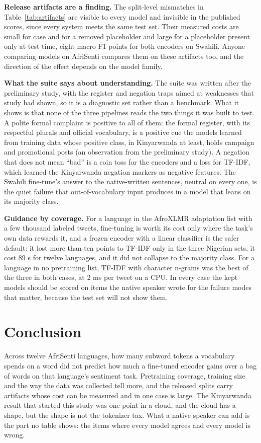 \documentclass[11pt]{article}
\begin{document}
\textbf{Release artifacts are a finding.} The split-level mismatches in Table~\ref{tab:artifacts} are visible to every model and invisible in the published scores, since every system meets the same test set. Their measured costs are small for case and for a removed placeholder and large for a placeholder present only at test time, eight macro F1 points for both encoders on Swahili. Anyone comparing models on AfriSenti compares them on these artifacts too, and the direction of the effect depends on the model family.

\textbf{What the suite says about understanding.} The suite was written after the preliminary study, with the register and negation traps aimed at weaknesses that study had shown, so it is a diagnostic set rather than a benchmark. What it shows is that none of the three pipelines reads the two things it was built to test. A polite formal complaint is positive to all of them: the formal register, with its respectful plurals and official vocabulary, is a positive cue the models learned from training data whose positive class, in Kinyarwanda at least, holds campaign and promotional posts (an observation from the preliminary study). A negation that does not mean ``bad'' is a coin toss for the encoders and a loss for TF-IDF, which learned the Kinyarwanda negation markers as negative features. The Swahili fine-tune's answer to the native-written sentences, neutral on every one, is the quiet failure that out-of-vocabulary input produces in a model that leans on its majority class.

\textbf{Guidance by coverage.} For a language in the AfroXLMR adaptation list with a few thousand labeled tweets, fine-tuning is worth its cost only where the task's own data rewards it, and a frozen encoder with a linear classifier is the safer default: it lost more than ten points to TF-IDF only in the three Nigerian sets, it cost 89 s for twelve languages, and it did not collapse to the majority class. For a language in no pretraining list, TF-IDF with character n-grams was the best of the three in both cases, at 2 ms per tweet on a CPU. In every case the kept models should be scored on items the native speaker wrote for the failure modes that matter, because the test set will not show them.

\section{Conclusion}
Across twelve AfriSenti languages, how many subword tokens a vocabulary spends on a word did not predict how much a fine-tuned encoder gains over a bag of words on that language's sentiment task. Pretraining coverage, training size and the way the data was collected tell more, and the released splits carry artifacts whose cost can be measured and in one case is large. The Kinyarwanda result that started this study was one point in a cloud, and the cloud has a shape, but the shape is not the tokenizer tax. What a native speaker can add is the part no table shows: the items where every model agrees and every model is wrong.
\end{document}
